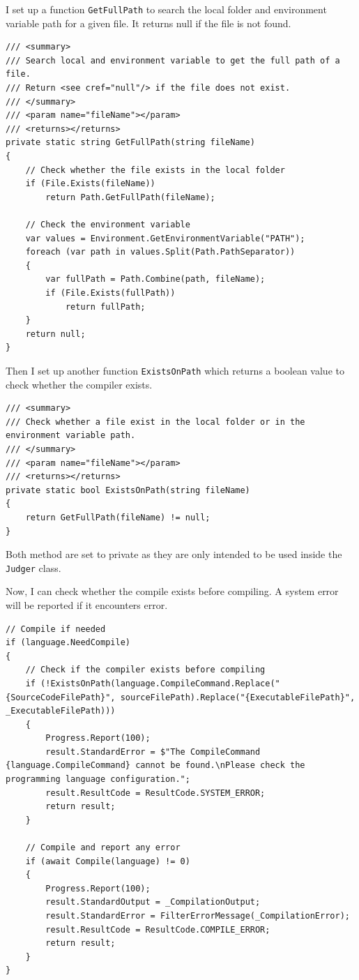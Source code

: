 \documentclass[a4paper]{report}
\newcommand{\code}{\texttt}
\begin{document}
I set up a function \code{GetFullPath} to search the local folder and environment variable path for a given file. It returns null if the file is not found.

\begin{verbatim}
/// <summary>
/// Search local and environment variable to get the full path of a file.
/// Return <see cref="null"/> if the file does not exist.
/// </summary>
/// <param name="fileName"></param>
/// <returns></returns>
private static string GetFullPath(string fileName)
{
    // Check whether the file exists in the local folder
    if (File.Exists(fileName))
        return Path.GetFullPath(fileName);

    // Check the environment variable
    var values = Environment.GetEnvironmentVariable("PATH");
    foreach (var path in values.Split(Path.PathSeparator))
    {
        var fullPath = Path.Combine(path, fileName);
        if (File.Exists(fullPath))
            return fullPath;
    }
    return null;
}
\end{verbatim}

Then I set up another function \code{ExistsOnPath} which returns a boolean value to check whether the compiler exists.

\begin{verbatim}
/// <summary>
/// Check whether a file exist in the local folder or in the environment variable path.
/// </summary>
/// <param name="fileName"></param>
/// <returns></returns>
private static bool ExistsOnPath(string fileName)
{
    return GetFullPath(fileName) != null;
}
\end{verbatim}

Both method are set to private as they are only intended to be used inside the \code{Judger} class.

Now, I can check whether the compile exists before compiling. A system error will be reported if it encounters error.

\begin{verbatim}
// Compile if needed
if (language.NeedCompile)
{
    // Check if the compiler exists before compiling
    if (!ExistsOnPath(language.CompileCommand.Replace("{SourceCodeFilePath}", sourceFilePath).Replace("{ExecutableFilePath}", _ExecutableFilePath)))
    {
        Progress.Report(100);
        result.StandardError = $"The CompileCommand {language.CompileCommand} cannot be found.\nPlease check the programming language configuration.";
        result.ResultCode = ResultCode.SYSTEM_ERROR;
        return result;
    }

    // Compile and report any error
    if (await Compile(language) != 0)
    {
        Progress.Report(100);
        result.StandardOutput = _CompilationOutput;
        result.StandardError = FilterErrorMessage(_CompilationError);
        result.ResultCode = ResultCode.COMPILE_ERROR;
        return result;
    }
}
\end{verbatim}
\end{document}

